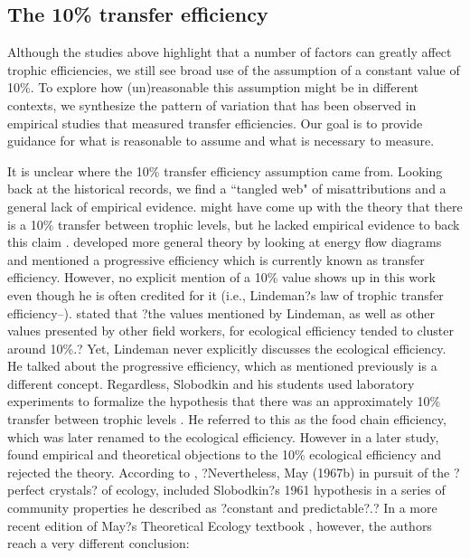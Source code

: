 \documentclass[oneside,12pt,final]{sty/ucthesis-CA2012}
\let\cite\citep                             %
\begin{document}
\begin{mainmatter}
\subsection*{The 10\% transfer efficiency}
Although the studies above highlight that a number of factors can greatly affect trophic efficiencies, we still see broad use of the assumption of a constant value of 10\%. To explore how (un)reasonable this assumption might be in different contexts, we synthesize the pattern of variation that has been observed in empirical studies that measured transfer efficiencies. Our goal is to provide guidance for what is reasonable to assume and what is necessary to measure.

\vspace{5mm}

It is unclear where the 10\% transfer efficiency assumption came from. Looking back at the historical records, we find a ``tangled web" of misattributions and a general lack of empirical evidence. \citet{semper1881animal} might have come up with the theory that there is a 10\% transfer between trophic levels, but he lacked empirical evidence to back this claim \cite{mcintosh1986background}. \citet{lindeman1942trophic} developed more general theory by looking at energy flow diagrams and mentioned a progressive efficiency which is currently known as transfer efficiency. However, no explicit mention of a 10\% value shows up in this work even though he is often credited for it (i.e., Lindeman?s law of trophic transfer efficiency--\citealt{chapman1998ecology}). \citet{slobodkin1959energetics, slobodkin1972inconstancy} stated that ?the values mentioned by Lindeman, as well as other values presented by other field workers, for ecological efficiency tended to cluster around 10\%.? Yet, Lindeman never explicitly discusses the ecological efficiency. He talked about the progressive efficiency, which as mentioned previously is a different concept. Regardless, Slobodkin and his students used laboratory experiments to formalize the hypothesis that there was an approximately 10\% transfer between trophic levels \cite{slobodkin1959energetics}. He referred to this as the food chain efficiency, which was later renamed to the ecological efficiency. However in a later study, \citet{slobodkin1972inconstancy} found empirical and theoretical objections to the 10\% ecological efficiency and rejected the theory. According to \citet{mcintosh1986background}, ?Nevertheless, May (1967b) in pursuit of the ?perfect crystals? of ecology, included Slobodkin?s 1961 hypothesis in a series of community properties he described as ?constant and predictable?.? In a more recent edition of May?s Theoretical Ecology textbook , however, the authors reach a very different conclusion:


\end{mainmatter}
\end{document}
